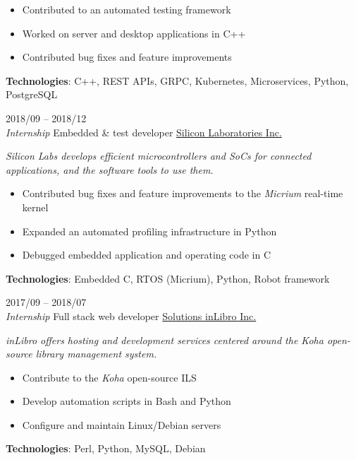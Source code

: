 \documentclass[9pt]{developercv2} %
\begin{document}
\begin{entrylist}
{		\begin{itemize}
			\renewcommand{\labelitemi}{\raisebox{.45ex}{\rule{.6ex}{.6ex}}}
			\setlength\itemsep{-1pt}
			\item Contributed to an automated testing framework
			\item Worked on server and desktop applications in C++
			\item Contributed bug fixes and feature improvements
		\end{itemize}

		\textbf{Technologies}: C++, REST APIs, GRPC, Kubernetes, Microservices, Python, PostgreSQL
	}
	\entry
	{2018/09 -- 2018/12\\{\small\emph{Internship}}}
	{Embedded \& test developer}
	{\href{https://www.silabs.com/}{Silicon Laboratories Inc.}}
	{
		\emph{
			Silicon Labs develops efficient microcontrollers and SoCs for
			connected applications, and the software tools to use them.
		}

		\begin{itemize}
			\renewcommand{\labelitemi}{\raisebox{.45ex}{\rule{.6ex}{.6ex}}}
			\setlength\itemsep{-1pt}
			\item Contributed bug fixes and feature improvements to the \emph{Micrium} real-time kernel
			\item Expanded an automated profiling infrastructure in Python
			\item Debugged embedded application and operating code in C
		\end{itemize}
	
		\textbf{Technologies}: Embedded C, RTOS (Micrium), Python, Robot framework
	}
	\entry
	{2017/09 -- 2018/07\\{\small\emph{Internship}}}
	{Full stack web developer}
	{\href{https://inlibro.com/en/}{Solutions inLibro Inc.}}
	{
		\emph{
			inLibro offers hosting and development services centered around the
			Koha open-source library management system.
		}

		\begin{itemize}
			\renewcommand{\labelitemi}{\raisebox{.45ex}{\rule{.6ex}{.6ex}}}
			\setlength\itemsep{-1pt}
			\item Contribute to the \emph{Koha} open-source ILS
			\item Develop automation scripts in Bash and Python
			\item Configure and maintain Linux/Debian servers
		\end{itemize}
	
		\textbf{Technologies}: Perl, Python, MySQL, Debian
	}
\end{entrylist}
\end{document}
